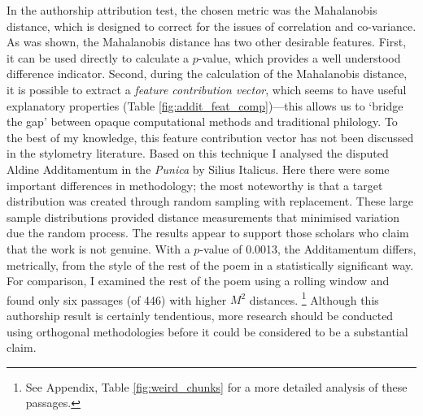 \documentclass[11pt,a4paper]{scrartcl} %
\begin{document}
{In the authorship attribution test, the chosen metric was the Mahalanobis distance, which is designed to correct for the issues of correlation and co-variance. As was shown, the Mahalanobis distance has two other desirable features. First, it can be used directly to calculate a $p$-value, which provides a well understood difference indicator. Second, during the calculation of the Mahalanobis distance, it is possible to extract a \textit{feature contribution vector}, which seems to have useful explanatory properties (Table \ref{fig:addit_feat_comp})---this allows us to `bridge the gap' between opaque computational methods and traditional philology. To the best of my knowledge, this feature contribution vector has not been discussed in the stylometry literature. Based on this technique I analysed the disputed Aldine Additamentum in the \textit{Punica} by Silius Italicus. Here there were some important differences in methodology; the most noteworthy is that a target distribution was created through random sampling with replacement. These large sample distributions provided distance measurements that minimised variation due the random process. The results appear to support those scholars who claim that the work is not genuine. With a $p$-value of 0.0013, the Additamentum differs, metrically, from the style of the rest of the poem in a statistically significant way. For comparison, I examined the rest of the poem using a rolling window and found only six passages (of 446) with higher $M^{2}$ distances.%
\footnote{See Appendix, Table \ref{fig:weird_chunks} for a more detailed analysis of these passages.}
Although this authorship result is certainly tendentious, more research should be conducted using orthogonal methodologies before it could be considered to be a substantial claim.
\newpage


\newpage
}
\end{document}
